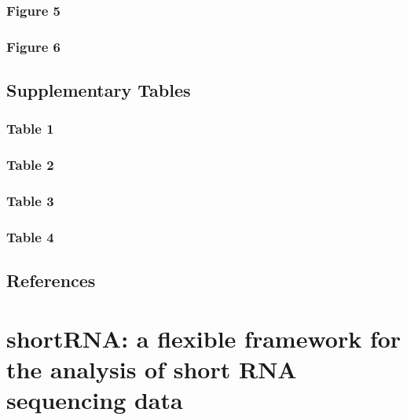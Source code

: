 \documentclass[12pt,twoside]{reedthesis}
\begin{document}
\hypertarget{figure-5}{%
\subsection{Figure 5}\label{figure-5}}

\newpage

\hypertarget{figure-6}{%
\subsection{Figure 6}\label{figure-6}}

\newpage

\hypertarget{supplementary-tables}{%
\section{Supplementary Tables}\label{supplementary-tables}}

\hypertarget{table-1}{%
\subsection{Table 1}\label{table-1}}

\newpage

\hypertarget{table-2}{%
\subsection{Table 2}\label{table-2}}

\newpage

\hypertarget{table-3}{%
\subsection{Table 3}\label{table-3}}

\newpage

\hypertarget{table-4}{%
\subsection{Table 4}\label{table-4}}

\newpage

\hypertarget{references}{%
\section{References}\label{references}}

\hypertarget{chapter3}{%
\chapter{shortRNA: a flexible framework for the analysis of short RNA sequencing data}\label{chapter3}}
\end{document}
